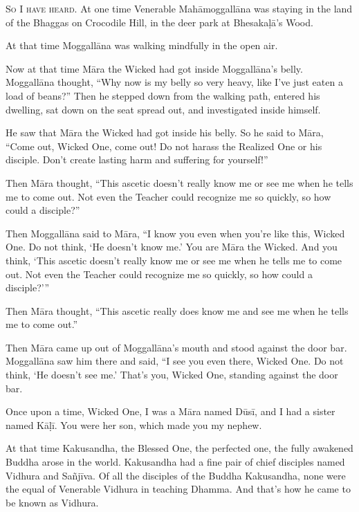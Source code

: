 \documentclass[12pt,openany]{book}%
\newcommand*{\scevam}[1]{\textsc{#1}}
\begin{document}
\scevam{So I have heard. }At one time Venerable \textsanskrit{Mahāmoggallāna} was staying in the land of the Bhaggas on Crocodile Hill, in the deer park at \textsanskrit{Bhesakaḷā}’s Wood. 

At that time \textsanskrit{Moggallāna} was walking mindfully in the open air. 

Now at that time \textsanskrit{Māra} the Wicked had got inside \textsanskrit{Moggallāna}’s belly. \textsanskrit{Moggallāna} thought, “Why now is my belly so very heavy, like I’ve just eaten a load of beans?” Then he stepped down from the walking path, entered his dwelling, sat down on the seat spread out, and investigated inside himself. 

He saw that \textsanskrit{Māra} the Wicked had got inside his belly. So he said to \textsanskrit{Māra}, “Come out, Wicked One, come out! Do not harass the Realized One or his disciple. Don’t create lasting harm and suffering for yourself!” 

Then \textsanskrit{Māra} thought, “This ascetic doesn’t really know me or see me when he tells me to come out. Not even the Teacher could recognize me so quickly, so how could a disciple?” 

Then \textsanskrit{Moggallāna} said to \textsanskrit{Māra}, “I know you even when you’re like this, Wicked One. Do not think, ‘He doesn’t know me.’ You are \textsanskrit{Māra} the Wicked. And you think, ‘This ascetic doesn’t really know me or see me when he tells me to come out. Not even the Teacher could recognize me so quickly, so how could a disciple?’” 

Then \textsanskrit{Māra} thought, “This ascetic really does know me and see me when he tells me to come out.” 

Then \textsanskrit{Māra} came up out of \textsanskrit{Moggallāna}’s mouth and stood against the door bar. \textsanskrit{Moggallāna} saw him there and said, “I see you even there, Wicked One. Do not think, ‘He doesn’t see me.’ That’s you, Wicked One, standing against the door bar. 

Once upon a time, Wicked One, I was a \textsanskrit{Māra} named \textsanskrit{Dūsī}, and I had a sister named \textsanskrit{Kāḷī}. You were her son, which made you my nephew. 

At that time Kakusandha, the Blessed One, the perfected one, the fully awakened Buddha arose in the world. Kakusandha had a fine pair of chief disciples named Vidhura and \textsanskrit{Sañjīva}. Of all the disciples of the Buddha Kakusandha, none were the equal of Venerable Vidhura in teaching Dhamma. And that’s how he came to be known as Vidhura. 
\end{document}
